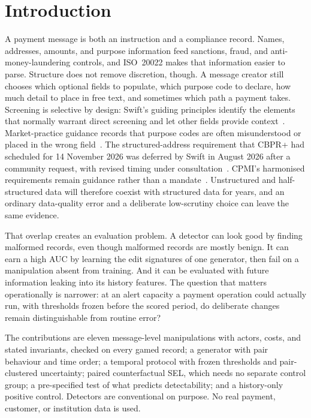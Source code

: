 \documentclass[conference]{IEEEtran}
\begin{document}
\section{Introduction}
A payment message is both an instruction and a compliance record. Names,
addresses, amounts, and purpose information feed sanctions, fraud, and
anti-money-laundering controls, and ISO~20022 makes that information easier
to parse. Structure does not remove discretion, though. A message creator
still chooses which optional fields to populate, which purpose code to
declare, how much detail to place in free text, and sometimes which path a
payment takes. Screening is selective by design: Swift's guiding principles
identify the elements that normally warrant direct screening and let other
fields provide context~\cite{swiftgp2021}. Market-practice guidance
records that purpose codes are often misunderstood or placed in the wrong
field~\cite{pmpg2024}. The structured-address requirement that CBPR+ had
scheduled for 14 November 2026 was deferred by Swift in August 2026 after a
community request, with revised timing under consultation~\cite{swift2026ext}.
CPMI's harmonised requirements remain guidance rather than a
mandate~\cite{cpmi2026}. Unstructured and half-structured data will therefore
coexist with structured data for years, and an ordinary data-quality error
and a deliberate low-scrutiny choice can leave the same evidence.

That overlap creates an evaluation problem. A detector can look good by
finding malformed records, even though malformed records are mostly benign.
It can earn a high AUC by learning the edit signatures of one generator, then
fail on a manipulation absent from training. And it can be evaluated with
future information leaking into its history features. The question that
matters operationally is narrower: at an alert capacity a payment operation
could actually run, with thresholds frozen before the scored period, do
deliberate changes remain distinguishable from routine error?

The contributions are eleven message-level manipulations with actors,
costs, and stated invariants, checked on every gamed record; a generator with pair
behaviour and time order; a temporal protocol with frozen thresholds and
pair-clustered uncertainty; paired counterfactual SEL, which needs no
separate control group; a pre-specified test of what predicts
detectability; and a history-only positive control. Detectors are
conventional on purpose. No real payment, customer, or institution data is
used.
\end{document}
